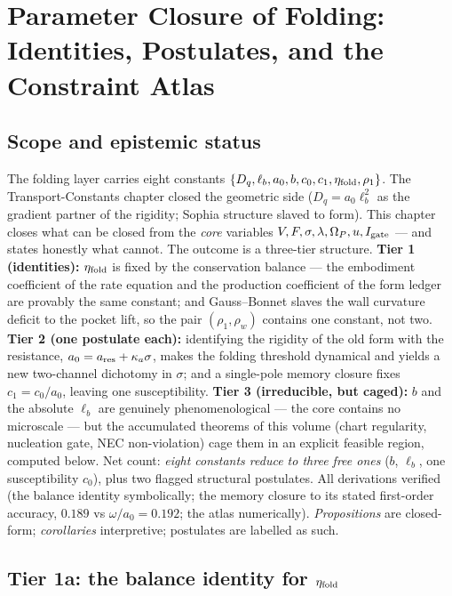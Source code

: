 \documentclass[11pt,a4paper,oneside]{book}
\newcommand{\Op}{\Omega_P}
\newcommand{\Igate}{I_{\rm gate}}
\newcommand{\Dq}{D_q}
\newcommand{\lb}{\ell_b}
\newcommand{\etaf}{\eta_{\rm fold}}
\theoremstyle{plain}
\theoremstyle{definition}
\theoremstyle{remark}
\begin{document}
\chapter{Parameter Closure of Folding: Identities, Postulates, and the Constraint Atlas}

\section*{Scope and epistemic status}
The folding layer carries eight constants
$\{\Dq,\lb,a_0,b,c_0,c_1,\etaf,\rho_1\}$. The Transport-Constants chapter closed the geometric side
($\Dq=a_0\lb^2$ as the gradient partner of the rigidity; Sophia structure slaved to form). This
chapter closes what can be closed from the \emph{core} variables
$V,F,\sigma,\lambda,\Op,u,\Igate$ --- and states honestly what cannot. The outcome is a three-tier
structure. \textbf{Tier 1 (identities):} $\etaf$ is fixed by the conservation balance --- the
embodiment coefficient of the rate equation and the production coefficient of the form ledger are
provably the same constant; and Gauss--Bonnet slaves the wall curvature deficit to the pocket lift,
so the pair $(\rho_1,\rho_w)$ contains one constant, not two. \textbf{Tier 2 (one postulate each):}
identifying the rigidity of the old form with the resistance, $a_0=a_{\rm res}+\kappa_a\sigma$,
makes the folding threshold dynamical and yields a new two-channel dichotomy in $\sigma$; and a
single-pole memory closure fixes $c_1=c_0/a_0$, leaving one susceptibility. \textbf{Tier 3
(irreducible, but caged):} $b$ and the absolute $\lb$ are genuinely phenomenological --- the core
contains no microscale --- but the accumulated theorems of this volume (chart regularity, nucleation
gate, NEC non-violation) cage them in an explicit feasible region, computed below. Net count:
\emph{eight constants reduce to three free ones} ($b$, $\lb$, one susceptibility $c_0$), plus two
flagged structural postulates. All derivations verified (the balance identity symbolically; the
memory closure to its stated first-order accuracy, $0.189$ vs $\omega/a_0=0.192$; the atlas
numerically). \emph{Propositions} are closed-form; \emph{corollaries} interpretive; postulates are
labelled as such.

\section{Tier 1a: the balance identity for $\etaf$}
\end{document}
